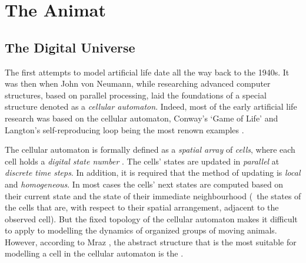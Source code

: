\graphicspath{{img/}}





\chapter{The Animat}
\label{chap:animat}


\section{The Digital Universe}
The first attempts to model artificial life date all the way back to the 1940s. It was then when John von Neumann, while researching advanced computer structures, 
based on parallel processing, laid the foundations of a special structure denoted as a \emph{cellular automaton}. Indeed, most of the early artificial life research was based on the cellular automaton, Conway's `Game of Life' \cite{gardner:1970} and Langton's self-reproducing loop \cite{langton:1984} being the most renown examples \cite{adami:1998,emmenche:1994,rucker:1993}.

The cellular automaton is formally defined as a \emph{spatial array} of \emph{cells}, where each cell holds a \emph{digital state number} \cite{rucker:1993}. The cells' states are updated in \emph{parallel} at \emph{discrete time steps}. In addition, it is required that the method of updating is \emph{local} and \emph{homogeneous}. In most cases the cells' next states are computed based on their current state and the state of their immediate neighbourhood (\ie\ the states of the cells that are, with respect to their spatial arrangement, adjacent to the observed cell). But the fixed topology of the cellular automaton makes it difficult to apply to modelling the dynamics of organized groups of moving animals.
%
However, according to Mraz \cite{mraz:2000}, the abstract structure that is the most suitable for modelling a cell in the cellular automaton is the  \cite{kohavi:1978}. 

